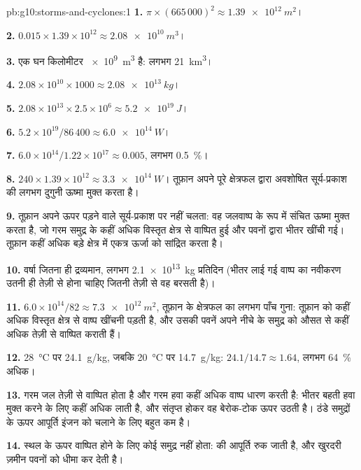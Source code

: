 \begin{solution}{pb:g10:storms-and-cyclones:1}
\textbf{1.} $\pi \times (665\,000)^2 \approx \qty{1.39e12}{m^2}$।

\textbf{2.} $0.015 \times 1.39\times10^{12} \approx \qty{2.08e10}{m^3}$।

\textbf{3.} एक घन किलोमीटर \qty{e9}{m^3} है: लगभग \qty{21}{km^3}।

\textbf{4.} $2.08\times10^{10} \times 1000 \approx \qty{2.08e13}{kg}$।

\textbf{5.} $2.08\times10^{13} \times 2.5\times10^6 \approx \qty{5.2e19}{J}$।

\textbf{6.} $5.2\times10^{19}/86\,400 \approx \qty{6.0e14}{W}$।

\textbf{7.} $6.0\times10^{14}/1.22\times10^{17} \approx 0.005$, लगभग
\qty{0.5}{\percent}।

\textbf{8.} $240 \times 1.39\times10^{12} \approx \qty{3.3e14}{W}$। तूफ़ान
अपने पूरे क्षेत्रफल द्वारा अवशोषित सूर्य-प्रकाश की लगभग दुगुनी ऊष्मा मुक्त करता है।

\textbf{9.} तूफ़ान अपने ऊपर पड़ने वाले सूर्य-प्रकाश पर नहीं चलता: वह जलवाष्प के रूप
में संचित ऊष्मा मुक्त करता है, जो गरम समुद्र के कहीं अधिक विस्तृत क्षेत्र से वाष्पित हुई
और पवनों द्वारा भीतर खींची गई। तूफ़ान कहीं अधिक बड़े क्षेत्र में एकत्र
ऊर्जा को सांद्रित करता है।

\textbf{10.} वर्षा जितना ही द्रव्यमान, लगभग \qty{2.1e13}{kg} प्रतिदिन (भीतर लाई गई
वाष्प का नवीकरण उतनी ही तेज़ी से होना चाहिए जितनी तेज़ी से वह बरसती है)।

\textbf{11.} $6.0\times10^{14}/82 \approx \qty{7.3e12}{m^2}$, तूफ़ान के क्षेत्रफल का लगभग
पाँच गुना: तूफ़ान को कहीं अधिक विस्तृत क्षेत्र से वाष्प खींचनी पड़ती है, और
उसकी पवनें अपने नीचे के समुद्र को औसत से कहीं अधिक तेज़ी से वाष्पित कराती हैं।

\textbf{12.} \qty{28}{\degreeCelsius} पर \qty{24.1}{g/kg}, जबकि
\qty{20}{\degreeCelsius} पर \qty{14.7}{g/kg}: $24.1/14.7 \approx 1.64$, लगभग
\qty{64}{\percent} अधिक।

\textbf{13.} गरम जल तेज़ी से वाष्पित होता है और गरम हवा कहीं अधिक वाष्प धारण करती है:
भीतर बहती हवा मुक्त करने के लिए कहीं अधिक  लाती है, और संतृप्त होकर
वह बेरोक-टोक ऊपर उठती है। ठंडे समुद्रों के ऊपर आपूर्ति इंजन को चलाने के लिए बहुत
कम है।

\textbf{14.} स्थल के ऊपर वाष्पित होने के लिए कोई समुद्र नहीं होता:  की
आपूर्ति रुक जाती है, और खुरदरी ज़मीन पवनों को धीमा कर देती है।


\end{solution}
